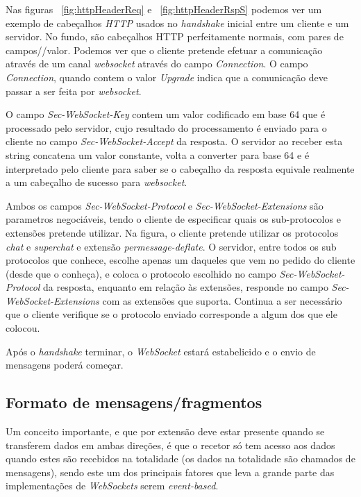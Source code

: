 \documentclass[a4paper]{article}
\begin{document}
Nas figuras ~\ref{fig:httpHeaderReq} e ~\ref{fig:httpHeaderRspS} podemos ver um exemplo de cabeçalhos \emph{HTTP} usados no \emph{handshake} inicial entre um cliente e um servidor. No fundo, são cabeçalhos HTTP perfeitamente normais, com pares de campos//valor. Podemos ver que o cliente pretende efetuar a comunicação através de um canal \emph{websocket} através do campo \emph{Connection}. O campo \emph{Connection}, quando contem o valor \emph{Upgrade} indica que a comunicação deve passar a ser feita por \emph{websocket}.

O campo \emph{Sec-WebSocket-Key} contem um valor codificado em base 64 que é processado pelo servidor, cujo resultado do processamento é enviado para o cliente no campo \emph{Sec-WebSocket-Accept} da resposta. O servidor ao receber esta string concatena um valor constante, volta a converter para base 64 e é interpretado pelo cliente para saber se o cabeçalho da resposta equivale realmente a um cabeçalho de sucesso para \emph{websocket}.

Ambos os campos \emph{Sec-WebSocket-Protocol} e \emph{Sec-WebSocket-Extensions} são parametros negociáveis, tendo o cliente de especificar quais os sub-protocolos e extensões pretende utilizar. Na figura, o cliente pretende utilizar os protocolos \emph{chat} e \emph{superchat} e extensão \emph{permessage-deflate}. O servidor, entre todos os sub protocolos que conhece, escolhe apenas um daqueles que vem no pedido do cliente (desde que o conheça), e coloca o protocolo escolhido no campo \emph{Sec-WebSocket-Protocol} da resposta, enquanto em relação às extensões, responde no campo \emph{Sec-WebSocket-Extensions} com as extensões que suporta. Continua a ser necessário que o cliente verifique se o protocolo enviado corresponde a algum dos que ele colocou.

Após o \emph{handshake} terminar, o \emph{WebSocket} estará estabelicido e o envio de mensagens poderá começar.

\subsection{Formato de mensagens/fragmentos}

Um conceito importante, e que por extensão deve estar presente quando se transferem dados em ambas direções, é que o recetor só tem acesso aos dados quando estes são recebidos na totalidade (os dados na totalidade são chamados de mensagens), sendo este um dos principais fatores que leva a grande parte das implementações de \emph{WebSockets} serem \emph{event-based}. 
\end{document}
